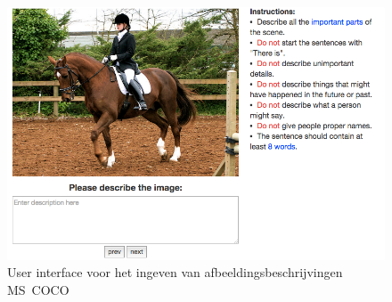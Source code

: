 \begin{figure}[tb]
    \centering
    \includegraphics[width=0.8\linewidth]{Images/coco_UI.png}
    \caption{User interface voor het ingeven van afbeeldingsbeschrijvingen \mbox{MS COCO}\cite{Rampf2015}}
    \label{fig:coco_ui}
\end{figure}

